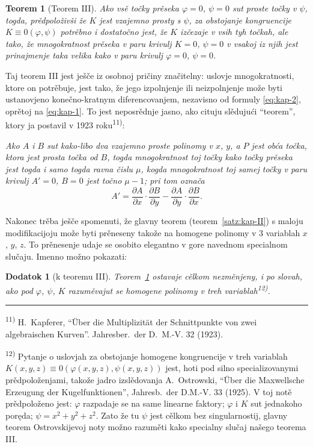 \documentclass[11pt]{article}
\newcommand{\foreign}[1]{#1}
\theoremstyle{plain}
\newtheorem{satz}{Teorem}
\newtheorem{zusatz}{Dodatok}
\begin{document}
\begin{satz}[Teorem III]\label{satz:kap-III}
Ako vsě točky prěseka $\varphi = 0$, $\psi = 0$ sut proste točky v
$\psi$, togda, prědpoloživši že $K$ jest vzajemno prosty s $\psi$,
za obstojanje kongruencije $K \equiv 0(\varphi, \psi)$ potrěbno i
dostatočno jest, že $K$ izčezaje v vsih tyh točkah, ale tako, že
mnogokratnost prěseka v paru krivulj $K = 0$, $\psi = 0$ v vsakoj
iz njih jest prinajmenje taka velika kako v paru krivulj
$\varphi = 0$, $\psi = 0$.
\end{satz}

Taj teorem III jest ješče iz osobnoj pričiny značitelny: uslovje
mnogokratnosti, ktore on potrěbuje, jest tako, že jego izpolnjenje
ili neizpolnjenje može byti ustanovjeno konečno-kratnym
diferencovanjem, nezavisno od formuly \eqref{eq:kap-2}, oprětoj na
\eqref{eq:kap-1}. To jest neposrědnje jasno, ako cituju slědujući
``teorem'', ktory ja postavil v 1923 roku\textsuperscript{11)}:

\smallskip
\textit{Ako $A$ i $B$ sut kako-libo dva vzajemno proste polinomy v
$x$, $y$, a $P$ jest obća točka, ktora jest prosta točka od $B$,
togda mnogokratnost toj točky kako točky prěseka jest togda i samo
togda ravna čislu $\mu$, kogda mnogokratnost toj samej točky v paru
krivulj $A' = 0$, $B = 0$ jest točno $\mu - 1$; pri tom označa}
\[
A' = \frac{\partial A}{\partial x} \cdot \frac{\partial B}{\partial y} -
\frac{\partial A}{\partial y} \cdot \frac{\partial B}{\partial x}.
\]

Nakonec trěba ješče spomenuti, že glavny teorem
(teorem~\ref{satz:kap-II}) s maloju modifikacijoju može byti
prěneseny takože na homogene polinomy v 3 variablah $x$, $y$, $z$.
To prěnesenje udaje se osobito elegantno v gore navednom specialnom
slučaju. Imenno možno pokazati:

\begin{zusatz}[k teoremu III]
Teorem~\ref{satz:kap-III} ostavaje cělkom nezměnjeny, i po slovah,
ako pod $\varphi$, $\psi$, $K$ razuměvajut se homogene polinomy v
treh variablah\textsuperscript{12)}.
\end{zusatz}

\vspace{0.5em}
\noindent\rule{\textwidth}{0.4pt}
\vspace{0.3em}

{\footnotesize
\textsuperscript{11)} H.\ Kapferer, ``\foreign{Über die Multiplizität der Schnittpunkte von zwei algebraischen
Kurven}''. \foreign{Jahresber.\ der D.\ M.-V.} 32 (1923).

\textsuperscript{12)} Pytanje o uslovjah za obstojanje homogene kongruencije v
treh variablah $K(x,y,z) \equiv 0(\varphi(x,y,z), \psi(x,y,z))$ jest,
hoti pod silno specializovanymi prědpoloženjami, takože jadro
izslědovanja \foreign{A.\ Ostrowski}, ``\foreign{Über die Maxwellsche Erzeugung der
Kugelfunktionen}'', \foreign{Jahresb.\ der D.M.-V.} 33 (1925). V toj
notě prědpoloženo jest: $\varphi$ razpadaje se na same linearne
faktory; $\varphi$ i $K$ sut jednakoho poręda; $\psi = x^{2} + y^{2} + z^{2}$.
Zato že tu $\psi$ jest cělkom bez singularnostij, glavny teorem
Ostrovskijevoj noty možno razuměti kako specialny slučaj našego
teorema III.
}
\end{document}

